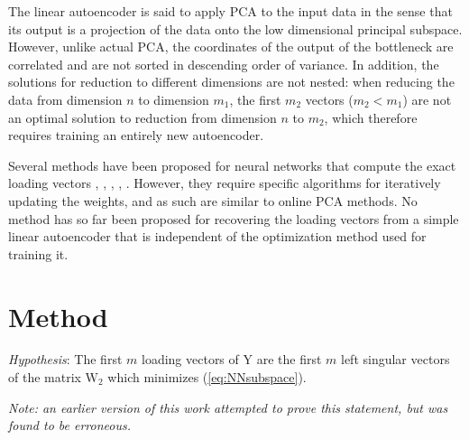 \documentclass[journal]{IEEEtran}
\begin{document}
The linear autoencoder is said to apply PCA to the input data in the sense that its output is a projection of the data onto the low dimensional principal subspace. However, unlike actual PCA, the coordinates of the output of the bottleneck are correlated and are not sorted in descending order of variance. In addition, the solutions for reduction to different dimensions are not nested: when reducing the data from dimension $n$ to dimension $m_1$, the first $m_2$ vectors ($m_2 < m_1$) are not an optimal solution to reduction from dimension $n$ to $m_2$, which therefore requires training an entirely new autoencoder.

Several methods have been proposed for neural networks that compute the exact loading vectors \cite{NNPCA1}, \cite{NNPCA2}, \cite{NNPCA3}, \cite{NNPCA4}, \cite{NNPCA5}. However, they require specific algorithms for iteratively updating the weights, and as such are similar to online PCA methods. No method has so far been proposed for recovering the loading vectors from a simple linear autoencoder that is independent of the optimization method used for training it.

\section{Method}

\emph{Hypothesis}: The first $m$ loading vectors of $\text{Y}$ are the first $m$ left singular vectors of the matrix $\text{W}_2$ which minimizes (\ref{eq:NNsubspace}).

\emph{Note: an earlier version of this work attempted to prove this statement, but was found to be erroneous.}
\end{document}
